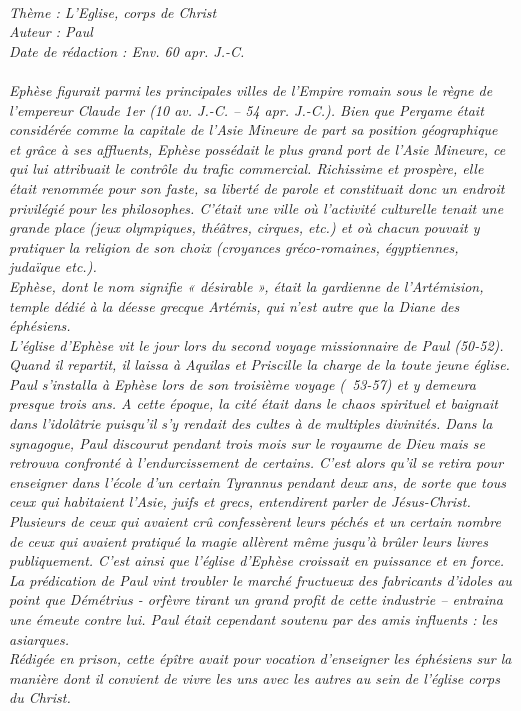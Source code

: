 \BFont
\noindent\hrulefill
\textit{
\bigskip
{\centering{}
\\Thème : L'Eglise, corps de Christ
\\Auteur : Paul
\\Date de rédaction : Env. 60 apr. J.-C.\\}
}
\textit{
\\Ephèse figurait parmi les principales villes de l’Empire romain sous le règne de l’empereur Claude 1er (10 av. J.-C. – 54 apr. J.-C.). Bien que Pergame était considérée comme la capitale de l’Asie Mineure de part sa position géographique et grâce à ses affluents, Ephèse possédait le plus grand port de l’Asie Mineure, ce qui lui attribuait le contrôle du trafic commercial. Richissime et prospère, elle était renommée pour son faste, sa liberté de parole et constituait donc un endroit privilégié pour les philosophes. C’était une ville où l’activité culturelle tenait une grande place  (jeux olympiques, théâtres, cirques, etc.) et où chacun pouvait y pratiquer la religion de son choix (croyances gréco-romaines, égyptiennes, judaïque etc.).
\bigskip
\\Ephèse, dont le nom signifie « désirable », était la gardienne de l’Artémision, temple dédié à la déesse grecque Artémis, qui n’est autre que la Diane des éphésiens.
\bigskip
\\L'église d’Ephèse vit le jour lors du second voyage missionnaire de Paul (50-52). Quand il repartit, il laissa à Aquilas et Priscille la charge de la toute  jeune église. Paul s’installa à Ephèse lors de son troisième voyage (~53-57) et y demeura presque trois ans. A cette époque, la cité était dans le chaos spirituel et baignait dans l’idolâtrie puisqu’il s’y rendait des cultes à de multiples divinités. Dans la synagogue, Paul discourut pendant trois mois sur le royaume de Dieu mais se retrouva confronté à l’endurcissement de certains. C’est alors qu’il se retira pour enseigner dans l’école d’un certain Tyrannus pendant deux ans, de sorte que tous ceux qui habitaient l’Asie, juifs et grecs, entendirent parler de Jésus-Christ.
\bigskip
\\Plusieurs de ceux qui avaient crû confessèrent leurs péchés et un certain nombre de ceux qui avaient pratiqué la magie allèrent même jusqu’à brûler leurs livres publiquement. C’est ainsi que l’église d’Ephèse croissait en puissance et en force. La prédication de Paul vint troubler le marché fructueux des fabricants d’idoles au point que Démétrius - orfèvre tirant un grand profit de cette industrie – entraina une émeute contre lui. Paul était cependant soutenu par des amis influents : les asiarques.
\bigskip
\\Rédigée en prison, cette épître avait pour vocation d’enseigner les éphésiens sur la manière dont il convient de vivre les uns avec les autres au sein de l’église corps du Christ.\bigskip
}
